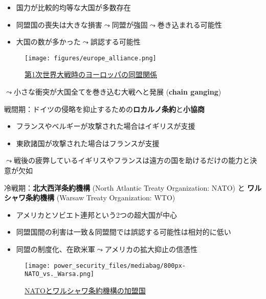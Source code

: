 \documentclass[
  xelatex,
  ja=standard]{bxjsarticle}
\providecommand{\tightlist}{%
  \setlength{\itemsep}{0pt}\setlength{\parskip}{0pt}}\usepackage{longtable,booktabs,array}
\begin{document}
\begin{itemize}
\tightlist
\item
  国力が比較的均等な大国が多数存在
\item
  同盟国の喪失は大きな損害\(\leadsto\)同盟が強固\(\leadsto\)巻き込まれる可能性
\item
  大国の数が多かった\(\leadsto\)誤認する可能性
\end{itemize}

\begin{figure}[htpb]

{\centering \texttt{[image: figures/europe\_alliance.png]}

}

\caption{\href{https://commons.wikimedia.org/wiki/File:Map_Europe_alliances_1914-en.svg}{第1次世界大戦時のヨーロッパの同盟関係}}

\end{figure}

\(\leadsto\)小さな衝突が大国全てを巻き込む大戦へと発展 (\textbf{chain
ganging})\citep{christensen1990}

戦間期：ドイツの侵略を抑止するための\textbf{ロカルノ条約}と\textbf{小協商}

\begin{itemize}
\tightlist
\item
  フランスやベルギーが攻撃された場合はイギリスが支援
\item
  東欧諸国が攻撃された場合はフランスが支援
\end{itemize}

\(\leadsto\)戦後の疲弊しているイギリスやフランスは遠方の国を助けるだけの能力と決意が欠如

冷戦期：\textbf{北大西洋条約機構} (North Atlantic Treaty Organization:
NATO) と \textbf{ワルシャワ条約機構} (Warsaw Treaty Organization: WTO)

\begin{itemize}
\tightlist
\item
  アメリカとソビエト連邦という2つの超大国が中心
\item
  同盟国間の利害は一致＆同盟間では誤認する可能性は相対的に低い
\item
  同盟の制度化、在欧米軍\(\leadsto\)アメリカの拡大抑止の信憑性
\end{itemize}

\begin{figure}[htpb]

{\centering \texttt{[image: power\_security\_files/mediabag/800px-NATO\_vs.\_Warsa.png]}

}

\caption{\href{https://commons.wikimedia.org/wiki/File:NATO_vs._Warsaw_(1949-1990).svg}{NATOとワルシャワ条約機構の加盟国}}

\end{figure}
\end{document}
